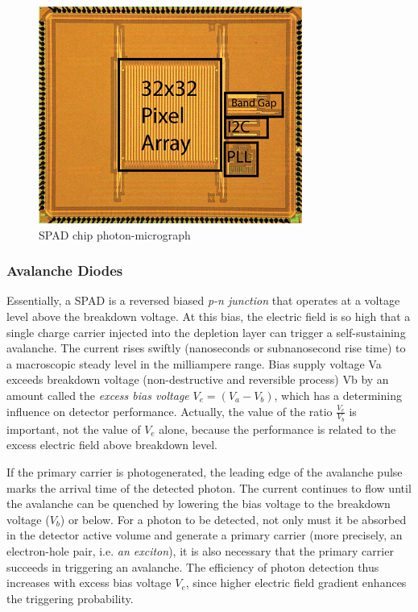 \begin{figure}[ht!]
\centering
\includegraphics[scale = 0.8]{chapters/img/32by32array.png}
\caption{\acs{SPAD} chip photon-micrograph}
\label{fig:spad_overview}
\end{figure} 

\subsubsection{Avalanche Diodes}
\label{diodes}	
Essentially, a \ac{SPAD} is a reversed biased \textit{p-n junction} that operates at a voltage level above the breakdown voltage. At this bias, the electric field is so high that a single charge carrier injected into the depletion layer can trigger a self-sustaining avalanche. The current rises swiftly (nanoseconds or subnanosecond rise time) to a macroscopic steady level in the milliampere range. Bias supply voltage Va exceeds breakdown voltage (non-destructive and reversible process) Vb by an amount called the \textit{excess bias voltage} $V_e = (V_a - V_b)$, which has a determining influence on detector performance. Actually, the value of the ratio $\frac{V_e}{V_b}$ is important, not the value of $V_e$ alone, because the performance is related to the excess electric field above breakdown level. 

If the primary carrier is photogenerated, the leading edge of the avalanche pulse marks the arrival time of the detected photon. The current continues to flow until the avalanche can be quenched by lowering the bias voltage to the breakdown voltage ($V_b$) or below. For a photon to be detected, not only must it be absorbed in the detector active volume and generate a primary carrier (more precisely, an electron-hole pair, i.e. \textit{an exciton}), it is also necessary that the primary carrier succeeds in triggering an avalanche. The efficiency of photon detection thus increases with excess bias voltage $V_e$, since higher electric field gradient enhances the triggering probability.   

